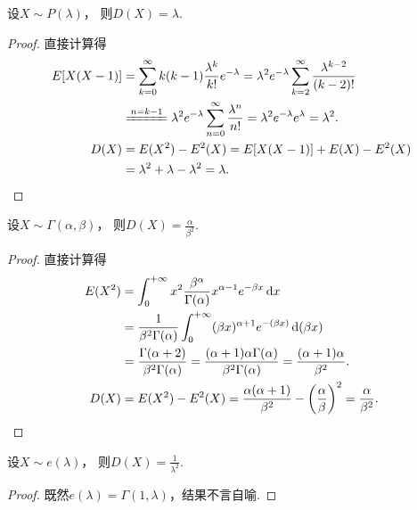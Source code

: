 \begin{proposition}
设\(X \sim P(\lambda)\)，
则\(D(X) = \lambda\).
\begin{proof}
直接计算得\begin{align*}
	E[X(X-1)]
	&= \sum_{k=0}^\infty {k(k-1) \frac{\lambda^k}{k!} e^{-\lambda}}
	= \lambda^2 e^{-\lambda} \sum_{k=2}^\infty {\frac{\lambda^{k-2}}{(k-2)!}} \\
	&\xlongequal{n=k-1} \lambda^2 e^{-\lambda} \sum_{n=0}^\infty {\frac{\lambda^n}{n!}}
	= \lambda^2 e^{-\lambda} e^\lambda = \lambda^2. \\
	D(X)
	&= E(X^2) - E^2(X)
	= E[X(X-1)] + E(X) - E^2(X) \\
	&= \lambda^2 + \lambda - \lambda^2 = \lambda.
	\qedhere
\end{align*}
\end{proof}
\end{proposition}

\begin{proposition}\label{theorem:方差.伽马分布的方差}
设\(X \sim \Gamma(\alpha,\beta)\)，
则\(D(X) = \frac{\alpha}{\beta^2}\).
\begin{proof}
\def\inti{\int_0^{+\infty}}%
直接计算得
\begin{align*}
	E(X^2) &= \int_0^{+\infty} x^2
		\frac{\beta^\alpha}{\Gamma(\alpha)} x^{\alpha-1} e^{-\beta x} \dd{x} \\
	&= \frac{1}{\beta^2 \Gamma(\alpha)}
		\int_0^{+\infty} (\beta x)^{\alpha+1} e^{-(\beta x)} \dd(\beta x) \\
	&= \frac{\Gamma(\alpha+2)}{\beta^2 \Gamma(\alpha)}
	= \frac{(\alpha+1) \alpha \Gamma(\alpha)}{\beta^2 \Gamma(\alpha)}
	= \frac{(\alpha+1) \alpha}{\beta^2}. \\
	D(X) &= E(X^2) - E^2(X)
	= \frac{\alpha (\alpha+1)}{\beta^2} - \left( \frac{\alpha}{\beta} \right)^2
	= \frac{\alpha}{\beta^2}.
	\qedhere
\end{align*}
\end{proof}
\end{proposition}

\begin{proposition}\label{theorem:方差.指数分布的方差}
设\(X \sim e(\lambda)\)，
则\(D(X) = \frac{1}{\lambda^2}\).
\begin{proof}
既然\(e(\lambda) = \Gamma(1,\lambda)\)，结果不言自喻.
\end{proof}
\end{proposition}

